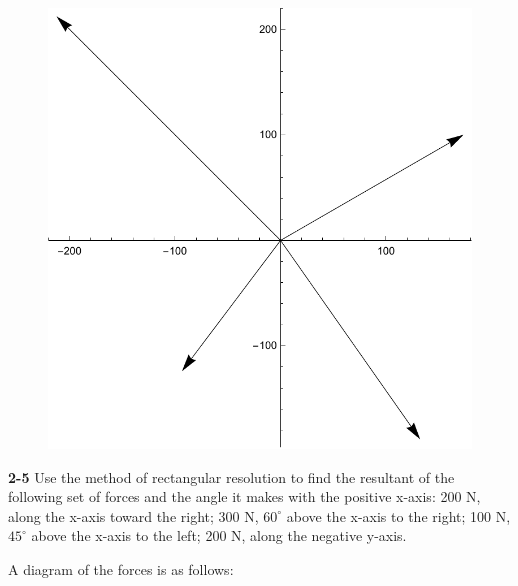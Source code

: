 \documentclass{amsart}
\begin{document}
\begin{figure}[h]
\includegraphics[scale=0.4]{2-4d}
\end{figure}

\vspace{\baselineskip}
\noindent
\textbf{2-5} Use the method of rectangular resolution to find the resultant of the following
set of forces and the angle it makes with the positive x-axis: 200 N, along the x-axis toward the right;
300 N, $60^\circ$ above the x-axis to the right; 100 N, $45^\circ$ above the x-axis to the left;
200 N, along the negative y-axis.

\clearpage
A diagram of the forces is as follows:
\end{document}
